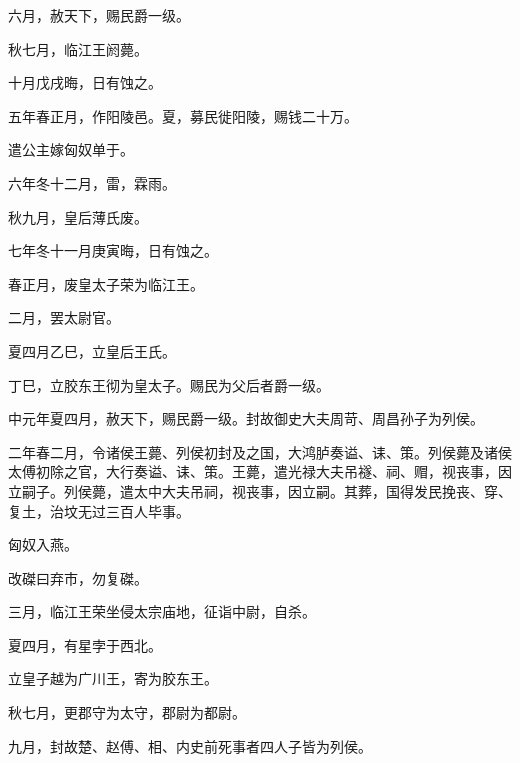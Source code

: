 \documentclass[12pt,UTF8]{ctexbook}
\begin{document}
六月，赦天下，赐民爵一级。



秋七月，临江王阏薨。



十月戊戌晦，日有蚀之。



五年春正月，作阳陵邑。夏，募民徙阳陵，赐钱二十万。



遣公主嫁匈奴单于。



六年冬十二月，雷，霖雨。



秋九月，皇后薄氏废。



七年冬十一月庚寅晦，日有蚀之。



春正月，废皇太子荣为临江王。



二月，罢太尉官。



夏四月乙巳，立皇后王氏。



丁巳，立胶东王彻为皇太子。赐民为父后者爵一级。



中元年夏四月，赦天下，赐民爵一级。封故御史大夫周苛、周昌孙子为列侯。



二年春二月，令诸侯王薨、列侯初封及之国，大鸿胪奏谥、诔、策。列侯薨及诸侯太傅初除之官，大行奏谥、诔、策。王薨，遣光禄大夫吊襚、祠、赗，视丧事，因立嗣子。列侯薨，遣太中大夫吊祠，视丧事，因立嗣。其葬，国得发民挽丧、穿、复土，治坟无过三百人毕事。



匈奴入燕。



改磔曰弃市，勿复磔。



三月，临江王荣坐侵太宗庙地，征诣中尉，自杀。



夏四月，有星孛于西北。



立皇子越为广川王，寄为胶东王。



秋七月，更郡守为太守，郡尉为都尉。



九月，封故楚、赵傅、相、内史前死事者四人子皆为列侯。
\end{document}
